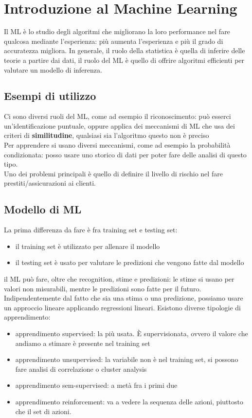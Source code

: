 \documentclass{article}
\begin{document}
\section{Introduzione al Machine Learning}
Il ML è lo studio degli algoritmi che migliorano la loro performance nel fare qualcosa mediante l'esperienza: più aumenta l'esperienza e più il grado di accuratezza migliora. In generale, il ruolo della statistica è quella di inferire delle teorie a partire dai dati, il ruolo del ML è quello di offrire algoritmi efficienti per valutare un modello di inferenza.
\subsection{Esempi di utilizzo}
Ci sono diversi ruoli del ML, come ad esempio il riconoscimento: può esserci un'identificazione puntuale, oppure applica dei meccanismi di ML che usa dei criteri di \textbf{similitudine}, qualsiasi sia l'algoritmo questo non è preciso\\ Per apprendere si usano diversi meccanismi, come ad esempio la probabilità condizionata: posso usare uno storico di dati per poter fare delle analisi di questo tipo.\\ Uno dei problemi principali è quello di definire il livello di rischio nel fare prestiti/assicurazioni ai clienti.
\subsection{Modello di ML}
La prima differenza da fare è fra training set e testing set:
\begin{itemize}
\item il training set è utilizzato per allenare il modello
\item il testing set è usato per valutare le predizioni che vengono fatte dal modello
\end{itemize}
il ML può fare, oltre che recognition, stime e predizioni: le stime si usano per valori non misurabili, mentre le predizioni sono fatte per il futuro. Indipendentemente dal fatto che sia una stima o una predizione, possiamo usare un approccio lineare applicando regressioni lineari. Esistono diverse tipologie di apprendimento:
\begin{itemize}
\item apprendimento supervised: la più usata. È supervisionata, ovvero il valore che andiamo a stimare è presente nel training set
\item apprendimento unsupervised: la variabile non è nel training set, si possono fare analisi di correlazione o cluster analysis
\item apprendimento sem-supervised: a metà fra i primi due
\item apprendimento reinforcement: va a vedere la sequenza delle azioni, piuttosto che il set di azioni.
\end{itemize}
\end{document}
